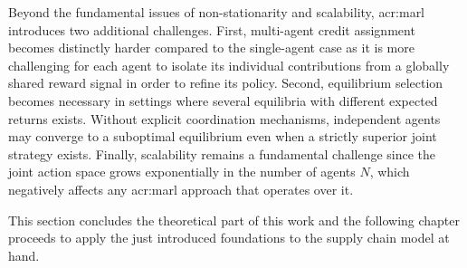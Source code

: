 Beyond the fundamental issues of non-stationarity and scalability, \gls{acr:marl} introduces two additional challenges. First, multi-agent credit assignment becomes distinctly harder compared to the single-agent case as it is more challenging for each agent to isolate its individual contributions from a globally shared reward signal in order to refine its policy. Second, equilibrium selection becomes necessary in settings where several equilibria with different expected returns exists. Without explicit coordination mechanisms, independent agents may converge to a suboptimal equilibrium even when a strictly superior joint strategy exists. Finally, scalability remains a fundamental challenge since the joint action space grows exponentially in the number of agents $N$, which negatively affects any \gls{acr:marl} approach that operates over it.

This section concludes the theoretical part of this work and the following chapter proceeds to apply the just introduced foundations to the supply chain model at hand.